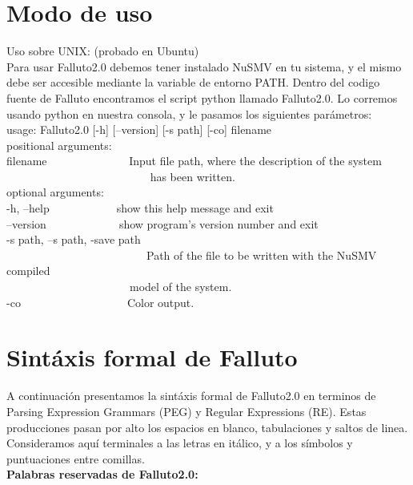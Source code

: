 \documentclass[titlepage, 12pt]{book}
\begin{document}
\chapter{Modo de uso}
Uso sobre UNIX: (probado en Ubuntu)\\

Para usar Falluto2.0 debemos tener instalado NuSMV en tu sistema, y el mismo debe ser accesible mediante la variable de entorno PATH. Dentro del codigo fuente de Falluto encontramos el script python llamado Falluto2.0. Lo corremos usando python en nuestra consola, y le pasamos los siguientes par\'ametros:\\

\noindent usage: Falluto2.0 [-h] [--version] [-s path] [-co] filename\\

\noindent positional arguments:\\
\indent filename~~~~~~~~~~~~~~ Input file path, where the description of the system\\
\indent~~~~~~~~~~~~~~~~~~~~~~~~~ has been written.\\

\noindent optional arguments:\\
\indent  -h, --help~~~~~~~~~~~~show this help message and exit\\
\indent  --version~~~~~~~~~~~~~show program's version number and exit\\
\indent  -s path, --s path, -save path\\
\indent  ~~~~~~~~~~~~~~~~~~~~~~~~~Path of the file to be written with the NuSMV compiled\\
\indent  ~~~~~~~~~~~~~~~~~~~~~~model of the system.\\
\indent  -co~~~~~~~~~~~~~~~~~~~Color output.\\


\chapter{Sint\'axis formal de Falluto}
\label{sintaxisFormal}

A continuaci\'on presentamos la sint\'axis formal de Falluto2.0 en terminos de Parsing Expression Grammars (PEG) y Regular Expressions (RE). Estas producciones pasan por alto los espacios en blanco, tabulaciones y saltos de linea. Consideramos aqu\'i terminales a las letras en it\'alico, y a los s\'imbolos y puntuaciones entre comillas.\\

\textbf{Palabras reservadas de Falluto2.0:}\\
\end{document}
